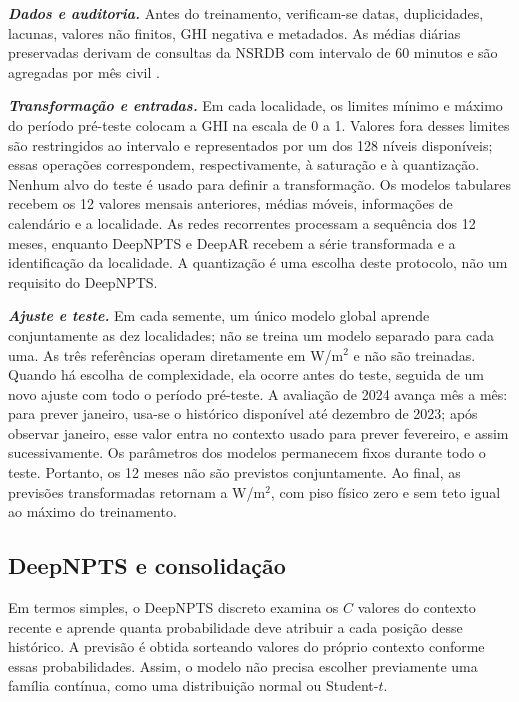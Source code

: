 \documentclass[12pt,a4paper,fleqn]{article}
\begin{document}
\noindent\textbf{\textit{Dados e auditoria.}} Antes do treinamento, verificam-se datas, duplicidades, lacunas, valores não finitos, GHI negativa e metadados. As médias diárias preservadas derivam de consultas da NSRDB com intervalo de 60 minutos e são agregadas por mês civil \citep{sengupta2018}.

\noindent\textbf{\textit{Transformação e entradas.}} Em cada localidade, os limites mínimo e máximo do período pré-teste colocam a GHI na escala de 0 a 1. Valores fora desses limites são restringidos ao intervalo e representados por um dos 128 níveis disponíveis; essas operações correspondem, respectivamente, à saturação e à quantização. Nenhum alvo do teste é usado para definir a transformação. Os modelos tabulares recebem os 12 valores mensais anteriores, médias móveis, informações de calendário e a localidade. As redes recorrentes processam a sequência dos 12 meses, enquanto DeepNPTS e DeepAR recebem a série transformada e a identificação da localidade. A quantização é uma escolha deste protocolo, não um requisito do DeepNPTS.

\noindent\textbf{\textit{Ajuste e teste.}} Em cada semente, um único modelo global aprende conjuntamente as dez localidades; não se treina um modelo separado para cada uma. As três referências operam diretamente em W/m$^2$ e não são treinadas. Quando há escolha de complexidade, ela ocorre antes do teste, seguida de um novo ajuste com todo o período pré-teste. A avaliação de 2024 avança mês a mês: para prever janeiro, usa-se o histórico disponível até dezembro de 2023; após observar janeiro, esse valor entra no contexto usado para prever fevereiro, e assim sucessivamente. Os parâmetros dos modelos permanecem fixos durante todo o teste. Portanto, os 12 meses não são previstos conjuntamente. Ao final, as previsões transformadas retornam a W/m$^2$, com piso físico zero e sem teto igual ao máximo do treinamento.

\subsection{DeepNPTS e consolidação}

Em termos simples, o DeepNPTS discreto examina os $C$ valores do contexto recente e aprende quanta probabilidade deve atribuir a cada posição desse histórico. A previsão é obtida sorteando valores do próprio contexto conforme essas probabilidades. Assim, o modelo não precisa escolher previamente uma família contínua, como uma distribuição normal ou Student-$t$.
\end{document}

